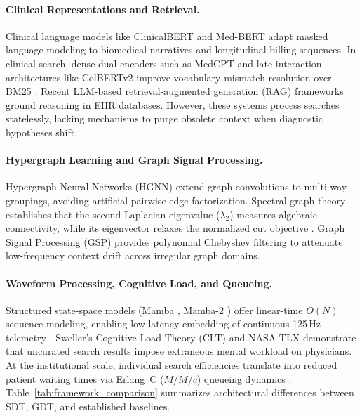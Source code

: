 \documentclass[10pt, onecolumn]{article}
\begin{document}
\paragraph{Clinical Representations and Retrieval.}
Clinical language models like ClinicalBERT \cite{huang2019clinicalbert,alsentzer2019publicly} and Med-BERT \cite{rasmy2021medbert} adapt masked language modeling to biomedical narratives and longitudinal billing sequences. In clinical search, dense dual-encoders such as MedCPT \cite{jin2023medcpt} and late-interaction architectures like ColBERTv2 \cite{santhanam2022colbertv2} improve vocabulary mismatch resolution over BM25 \cite{baeza1999modern}. Recent LLM-based retrieval-augmented generation (RAG) frameworks \cite{eickhoff2024ehrrag,zakka2024almanac} ground reasoning in EHR databases. However, these systems process searches statelessly, lacking mechanisms to purge obsolete context when diagnostic hypotheses shift.

\paragraph{Hypergraph Learning and Graph Signal Processing.}
Hypergraph Neural Networks (HGNN) \cite{feng2019hypergraph,zhou2006learning,gao2022hgnnplus} extend graph convolutions to multi-way groupings, avoiding artificial pairwise edge factorization. Spectral graph theory \cite{fiedler1973algebraic,chung1997spectral} establishes that the second Laplacian eigenvalue ($\lambda_2$) measures algebraic connectivity, while its eigenvector relaxes the normalized cut objective \cite{shi2000normalized,spielman2007spectral}. Graph Signal Processing (GSP) \cite{shuman2013emerging,ortega2018graph} provides polynomial Chebyshev filtering to attenuate low-frequency context drift across irregular graph domains.

\paragraph{Waveform Processing, Cognitive Load, and Queueing.}
Structured state-space models (Mamba \cite{gu2023mamba}, Mamba-2 \cite{dao2024mamba2}) offer linear-time $O(N)$ sequence modeling, enabling low-latency embedding of continuous 125\,Hz telemetry \cite{hyland2020hirid}. Sweller's Cognitive Load Theory (CLT) \cite{sweller1988cognitive} and NASA-TLX \cite{hart1988development} demonstrate that uncurated search results impose extraneous mental workload on physicians. At the institutional scale, individual search efficiencies translate into reduced patient waiting times via Erlang~C ($M/M/c$) queueing dynamics \cite{erlang1917solution,armony2015patient}. Table~\ref{tab:framework_comparison} summarizes architectural differences between SDT, GDT, and established baselines.
\end{document}
